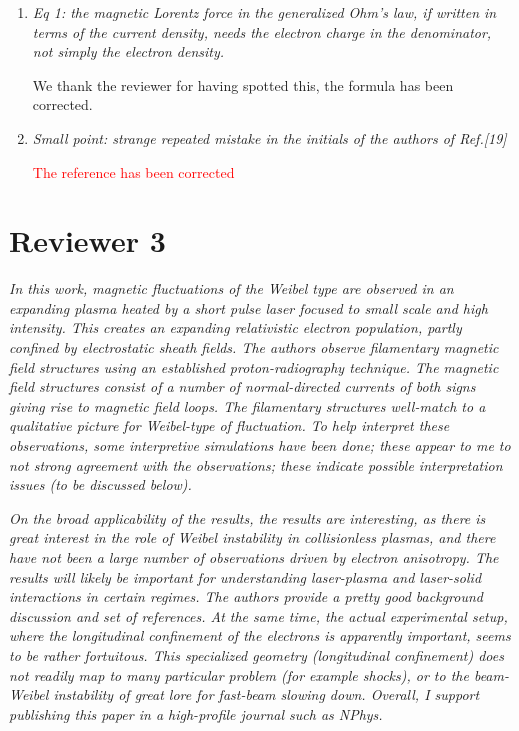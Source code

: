 \documentclass{article}
\begin{document}
\begin{enumerate}
\item \textit{Eq 1: the magnetic Lorentz force in the generalized Ohm's law, if written in terms of the current density, needs the electron charge in the denominator, not simply the electron density. }

We thank the reviewer for having spotted this, the formula has been corrected.

\item \textit{Small point: strange repeated mistake in the initials of the authors of Ref.[19] }

\textcolor{red}{The reference has been corrected}
\end{enumerate}

\section{Reviewer 3 }
\textit{
In this work, magnetic fluctuations of the Weibel type are observed in an expanding plasma heated by a short pulse laser focused to small scale and high intensity. This creates an expanding relativistic electron population, partly confined by electrostatic sheath fields. The authors observe filamentary magnetic field structures using an established proton-radiography technique. The magnetic field structures consist of a number of normal-directed currents of both signs giving rise to magnetic field loops. The filamentary structures well-match to a qualitative picture for Weibel-type of fluctuation. To help interpret these observations, some interpretive simulations have been done; these appear to me to not strong agreement with the observations; these indicate possible interpretation issues (to be discussed below).}

\textit{
On the broad applicability of the results, the results are interesting, as there is great interest in the role of Weibel instability in collisionless plasmas, and there have not been a large number of observations driven by electron anisotropy. The results will likely be important for understanding laser-plasma and laser-solid interactions in certain regimes. The authors provide a pretty good background discussion and set of references. At the same time, the actual experimental setup, where the longitudinal confinement of the electrons is apparently important, seems to be rather fortuitous. This specialized geometry (longitudinal confinement) does not readily map to many particular problem (for example shocks), or to the beam-Weibel instability of great lore for fast-beam slowing down. Overall, I support publishing this paper in a high-profile journal such as NPhys.}
\end{document}

